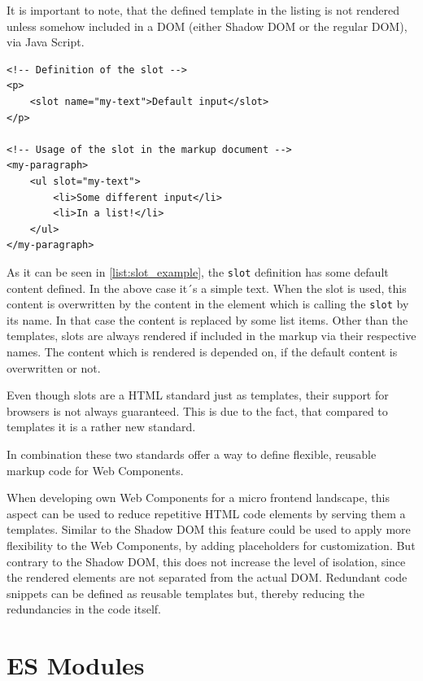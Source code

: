 It is important to note, that the defined template in the listing is not rendered unless somehow included in a DOM (either Shadow DOM or the regular DOM), via Java Script.

\begin{lstlisting}[language=HTML5, caption=Definition and usage of the \texttt{slot} standard \cite{wc_html_template_slots}, label=list:slot_example,  xleftmargin=.01\textwidth, xrightmargin=.01\textwidth]
<!-- Definition of the slot -->
<p>
	<slot name="my-text">Default input</slot>
</p>

<!-- Usage of the slot in the markup document -->
<my-paragraph>
	<ul slot="my-text">
		<li>Some different input</li>
		<li>In a list!</li>
	</ul>
</my-paragraph>
\end{lstlisting}

As it can be seen in \ref{list:slot_example}, the \texttt{slot} definition has some default content defined. In the above case it´s a simple text. When the slot is used, this content is overwritten by the content in the element which is calling the \texttt{slot} by its name.
In that case the content is replaced by some list items.
Other than the templates, slots are always rendered if included in the markup via their respective names. The content which is rendered is depended on, if the default content is overwritten or not.

Even though slots are a HTML standard just as templates, their support for browsers is not always guaranteed. This is due to the fact, that compared to templates it is a rather new standard.

In combination these two standards offer a way to define flexible, reusable markup code for Web Components.\cite{wc_html_template_slots} 

When developing own Web Components for a micro frontend landscape, this aspect can be used to reduce repetitive HTML code elements by serving them a templates. Similar to the Shadow DOM this feature could be used to apply more flexibility to the Web Components, by adding placeholders for customization. But contrary to the Shadow DOM, this does not increase the level of isolation, since the rendered elements are not separated from the actual DOM. Redundant code snippets can be defined as reusable templates but, thereby reducing the redundancies in the code itself.

\section{ES Modules}

